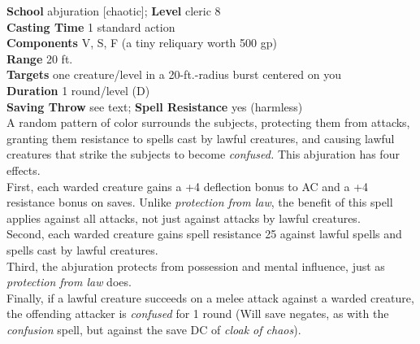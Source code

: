 \textbf{School} abjuration [chaotic]; \textbf{Level} cleric 8\\
\textbf{Casting Time} 1 standard action\\
\textbf{Components} V, S, F (a tiny reliquary worth 500 gp)\\
\textbf{Range} 20 ft.\\
\textbf{Targets} one creature/level in a 20-ft.-radius burst centered on you\\
\textbf{Duration} 1 round/level (D)\\
\textbf{Saving Throw} see text; \textbf{Spell Resistance} yes (harmless)\\
A random pattern of color surrounds the subjects, protecting them from attacks, granting them resistance to spells cast by lawful creatures, and causing lawful creatures that strike the subjects to become \textit{confused. }This abjuration has four effects.\\
First, each warded creature gains a +4 deflection bonus to AC and a +4 resistance bonus on saves. Unlike \textit{protection from law}, the benefit of this spell applies against all attacks, not just against attacks by lawful creatures.\\
Second, each warded creature gains spell resistance 25 against lawful spells and spells cast by lawful creatures.\\
Third, the abjuration protects from possession and mental influence, just as \textit{protection from law }does.\\
Finally, if a lawful creature succeeds on a melee attack against a warded creature, the offending attacker is \textit{confused }for 1 round (Will save negates, as with the \textit{confusion }spell, but against the save DC of \textit{cloak of chaos}).\\
